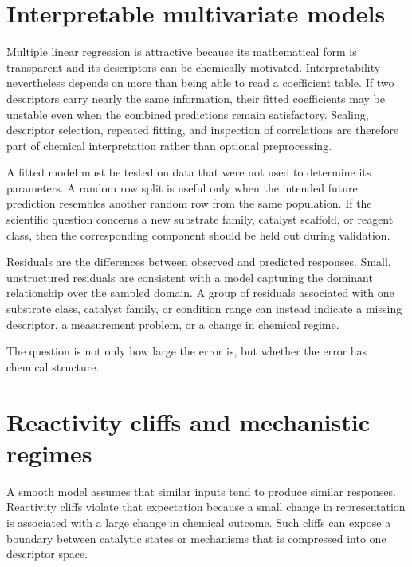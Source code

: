 \section{Interpretable multivariate models}

Multiple linear regression is attractive because its mathematical form is transparent and its descriptors can be chemically motivated.
Interpretability nevertheless depends on more than being able to read a coefficient table.
If two descriptors carry nearly the same information, their fitted coefficients may be unstable even when the combined predictions remain satisfactory.
Scaling, descriptor selection, repeated fitting, and inspection of correlations are therefore part of chemical interpretation rather than optional preprocessing.

A fitted model must be tested on data that were not used to determine its parameters.
A random row split is useful only when the intended future prediction resembles another random row from the same population.
If the scientific question concerns a new substrate family, catalyst scaffold, or reagent class, then the corresponding component should be held out during validation.

Residuals are the differences between observed and predicted responses.
Small, unstructured residuals are consistent with a model capturing the dominant relationship over the sampled domain.
A group of residuals associated with one substrate class, catalyst family, or condition range can instead indicate a missing descriptor, a measurement problem, or a change in chemical regime.

\begin{insightbox}
  The question is not only how large the error is, but whether the error has chemical structure.
\end{insightbox}

\section{Reactivity cliffs and mechanistic regimes}

A smooth model assumes that similar inputs tend to produce similar responses.
Reactivity cliffs violate that expectation because a small change in representation is associated with a large change in chemical outcome.
Such cliffs can expose a boundary between catalytic states or mechanisms that is compressed into one descriptor space.

